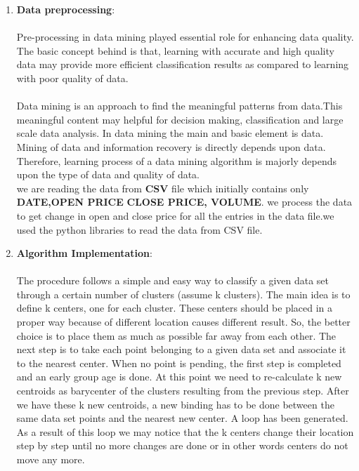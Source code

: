 \documentclass[12pt]{report}
\begin{document}
\begin{enumerate}
\item 
\textbf{Data preprocessing}:\\\\
Pre-processing in data mining played essential role for
enhancing data quality. The basic concept behind is that,
learning with accurate and high quality data may provide
more efficient classification results as compared to learning
with poor quality of data.\\\\
Data mining is an approach to find the meaningful patterns
from data.This meaningful content may helpful for decision
making, classification and large scale data analysis.
In data mining the main and basic
element is data. Mining of data and information recovery is
directly depends upon data. Therefore, learning process of a
data mining algorithm is majorly depends upon the type of
data and quality of data.\\
we are reading the data from \textbf{CSV} file which initially contains only \textbf{DATE,OPEN PRICE} \textbf{CLOSE PRICE, VOLUME}. we process the data to get change in open and close price for all the entries in the data file.we used the python libraries to read the data from CSV file.
\item 
\textbf{Algorithm Implementation}:\\\\
The procedure follows a simple and  easy  way  to classify a given data set  through a certain number of  clusters (assume k clusters). The  main  idea  is to define k centers, one for each cluster. These centers  should  be placed in a proper  way  because of  different  location  causes different  result. So, the better  choice  is  to place them  as  much as possible  far away from each other. The  next  step is to take each point belonging  to a  given data set and associate it to the nearest center. When no point  is  pending,  the first step is completed and an early group age  is done. At this point we need to re-calculate k new centroids as barycenter of  the clusters resulting from the previous step. After we have these k new centroids, a new binding has to be done  between  the same data set points  and  the nearest new center. A loop has been generated. As a result of  this loop we  may  notice that the k centers change their location step by step until no more changes  are done or  in  other words centers do not move any more.



\end{enumerate}
\end{document}
